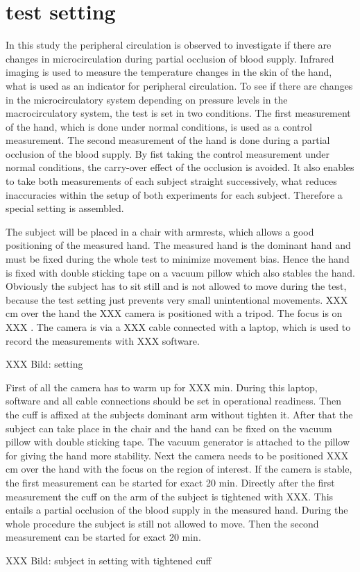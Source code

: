 \chapter{test setting}
In this study the peripheral circulation is observed to investigate if there are changes in microcirculation during partial occlusion of blood supply. Infrared imaging is used to measure the temperature changes in the skin of the hand, what is used as an indicator for peripheral circulation. 
To see if there are changes in the microcirculatory system depending on pressure levels in the macrocirculatory system, the test is set in two conditions. The first measurement of the hand, which is done under normal conditions, is used as a control measurement. The second measurement of the hand is done during a partial occlusion of the blood supply. By fist taking the control measurement under normal conditions, the carry-over effect of the occlusion is avoided. It also enables to take both measurements of each subject straight successively, what reduces inaccuracies within the setup of both experiments for each subject. Therefore a special setting is assembled.

The subject will be placed in a chair with armrests, which allows a good positioning of the measured hand. The measured hand is the dominant hand and must be fixed during the whole test to minimize movement bias. Hence the hand is fixed with double sticking tape on a vacuum pillow which also stables the hand. Obviously the subject has to sit still and is not allowed to move during the test, because the test setting just prevents very small unintentional movements.
XXX cm over the hand the XXX camera is positioned with a tripod. The focus is on XXX .
The camera is via a XXX cable connected with a laptop, which is used to record the measurements with XXX software.

XXX Bild: setting

First of all the camera has to warm up for XXX min. During this laptop, software and all cable connections  should be set in operational readiness. Then the cuff is affixed at the subjects dominant arm without tighten it. After that the subject can take place in the chair and the hand can be fixed on the vacuum pillow with double sticking tape. The vacuum generator is attached to the pillow for giving the hand more stability. Next the camera needs to be positioned XXX cm over the hand with the focus on the region of interest. If the camera is stable, the first measurement can be started for exact 20 min.
Directly after the first measurement the cuff on the arm of the subject is tightened with XXX. This entails a partial occlusion of the blood supply in the measured hand. During the whole procedure the subject is still not allowed to move. Then the second measurement can be started for exact 20 min.

XXX Bild: subject in setting with tightened cuff
